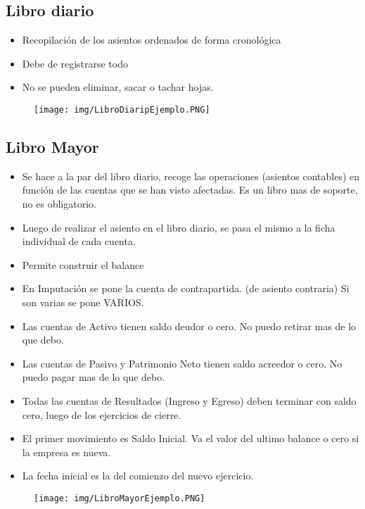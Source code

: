 \documentclass[titlepage,a4paper]{article}
\begin{document}
\subsection{Libro diario}
\begin{itemize}
\item Recopilación de los asientos ordenados de forma cronológica
\item Debe de registrarse todo
\item No se pueden eliminar, sacar o tachar hojas.
\end{itemize}

\begin{figure}[!htb]
    \centering
    \texttt{[image: img/LibroDiaripEjemplo.PNG]}
\end{figure}

\subsection{Libro Mayor}
\begin{itemize}
\item Se hace a la par del libro diario, recoge las operaciones (asientos contables) en función de las cuentas que se han visto afectadas. Es un libro mas de soporte, no es obligatorio.
\item Luego de realizar el asiento en el libro diario, se pasa el mismo a la ficha individual de cada cuenta.
\item Permite construir el balance
\item En Imputación se pone la cuenta de contrapartida. (de asiento contraria) Si son varias se pone VARIOS.
\item Las cuentas de Activo tienen saldo deudor o cero. No puedo retirar mas de lo que debo.
\item Las cuentas de Pasivo y Patrimonio Neto tienen saldo acreedor o cero. No puedo pagar mas de lo que debo.
\item Todas las cuentas de Resultados (Ingreso y Egreso) deben terminar con saldo cero, luego de los ejercicios de cierre.
\item El primer movimiento es Saldo Inicial. Va el valor del ultimo balance o cero si la empresa es nueva.
\item La fecha inicial es la del comienzo del nuevo ejercicio.
\end{itemize}

\begin{figure}[!htb]
    \centering
    \texttt{[image: img/LibroMayorEjemplo.PNG]}
\end{figure}
\end{document}
